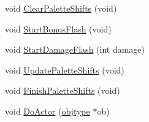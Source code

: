 \begin{DoxyCompactItemize}
\item 
void \hyperlink{WL__PLAY_8C_a855e78d8cabc6be0f77876b4597b25f1}{ClearPaletteShifts} (void)
\item 
void \hyperlink{WL__PLAY_8C_a18616827acc24f2c2b1b9a77326bc024}{StartBonusFlash} (void)
\item 
void \hyperlink{WL__PLAY_8C_a9d82bd76126e466b5d9fa28eea3d00f1}{StartDamageFlash} (int damage)
\item 
void \hyperlink{WL__PLAY_8C_a04fa5e7859eabbc20d946b414b5de67b}{UpdatePaletteShifts} (void)
\item 
void \hyperlink{WL__PLAY_8C_aa8f57ca7046b2d2a91ed59450822ecbc}{FinishPaletteShifts} (void)
\item 
void \hyperlink{WL__PLAY_8C_af6b67ccc715009ed1b1da40a030e657d}{DoActor} (\hyperlink{structobjstruct}{objtype} $\ast$ob)
\end{DoxyCompactItemize}
